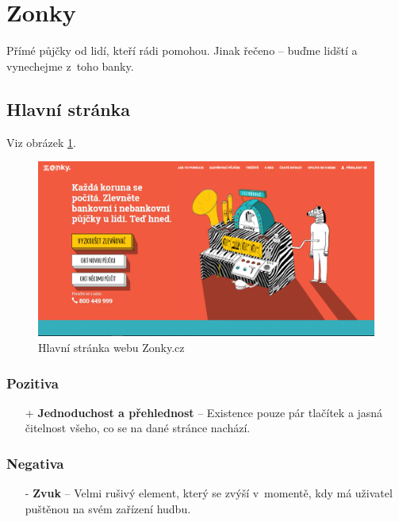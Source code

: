 \section{Zonky}
\label{analyza:zonky}

Přímé půjčky od lidí, kteří rádi pomohou. Jinak řečeno -- buďme lidští a vynechejme z~toho banky.

\subsection{Hlavní stránka}
Viz obrázek \ref{fig:zonky:home}.
\begin{figure}[h]
    \centering
    \includegraphics[width=1.0\textwidth]{media/zonky/home.png}
    \caption{Hlavní stránka webu Zonky.cz}
    \label{fig:zonky:home}
\end{figure}
\subsubsection*{Pozitiva}
\begin{itemize}
    \item[+] \textbf{Jednoduchost a přehlednost} -- Existence pouze pár tlačítek a jasná čitelnost všeho, co se na dané stránce nachází.
\end{itemize}
\subsubsection*{Negativa}
\begin{itemize}
    \item[-] \textbf{Zvuk} -- Velmi rušivý element, který se zvýší v~momentě, kdy má uživatel puštěnou na svém zařízení hudbu.
\end{itemize}



